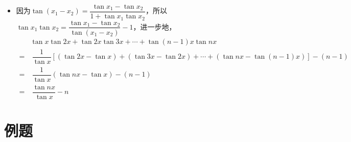 \begin{itemize}[leftmargin=\inteval{\myitemleftmargin}pt,itemsep=
   \inteval{\myitemitempsep}pt,topsep=\inteval{\myitemtopsep}pt]
\item 因为$ \tan(x_1-x_2)=\dfrac{\tan x_1-\tan x_2}{
    1+\tan x_1 \tan x_2} $，所以$ \tan x_1 \tan x_2=\dfrac{
    \tan x_1-\tan x_2}{\tan(x_1-x_2)}-1 $，进一步地，
\begin{align*}
    & \tan x\tan 2x+\tan 2x\tan 3x+\cdots +
    \tan (n-1)x\tan nx \\
    =&\ \dfrac{1}{\tan x}\left[(\tan 2x-\tan x)+
    (\tan 3x-\tan 2x)+\cdots +(\tan nx-\tan (n-1)x)\right]
    -(n-1)	\\ =&\  \dfrac{1}{\tan x}\left( \tan nx-
    \tan x\right)-(n-1) \\ =&\  \dfrac{\tan nx}{\tan x}-n
\end{align*}

\end{itemize}


\section{例题}
